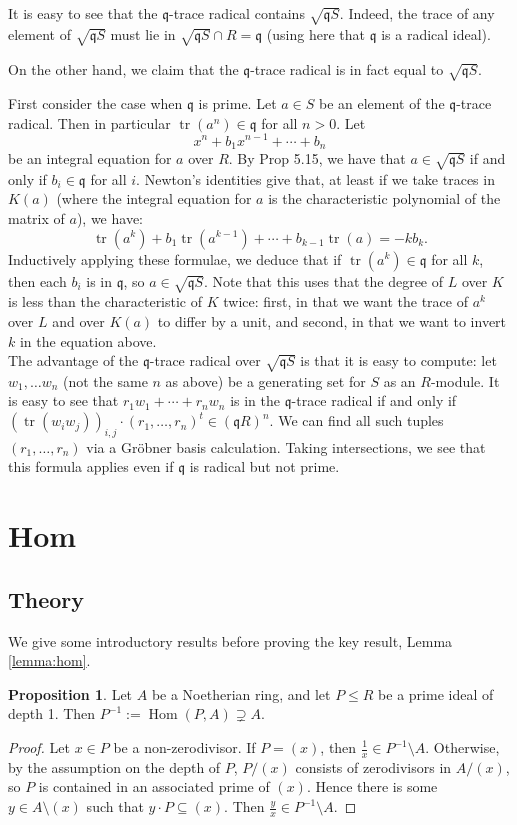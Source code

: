 \documentclass{amsart}
\theoremstyle{definition}
\newtheorem{proposition}[theorem]{Proposition}
\DeclareMathOperator{\tr}{tr}
\DeclareMathOperator{\Hom}{Hom}
\newcommand{\q}{\mathfrak{q}}
\begin{document}
It is easy to see that the $\q$-trace radical contains $\sqrt{\q S}$.  Indeed, the trace of any element of $\sqrt{\q S}$ must lie in $\sqrt{\q S}\cap R = \q$ (using here that $\q$ is a radical ideal).

On the other hand, we claim that the $\q$-trace radical is in fact equal to $\sqrt{\q S}$.

First consider the case when $\q$ is prime.  Let $a\in S$ be an element of the $\q$-trace radical.  Then in particular $\tr (a^n)\in \q$ for all $n > 0$.  Let
$$x^n + b_1 x^{n-1} + \cdots + b_n$$
be an integral equation for $a$ over $R$.  By \cite{AM} Prop 5.15, we have that $a\in \sqrt{\q S}$ if and only if $b_i \in \q$ for all $i$.  Newton's identities give that, at least if we take traces in $K(a)$ (where the integral equation for $a$ is the characteristic polynomial of the matrix of $a$), we have:
$$\tr(a^k) + b_1 \tr(a^{k-1}) + \cdots + b_{k-1} \tr(a) = -kb_k.$$
Inductively applying these formulae, we deduce that if $\tr(a^k) \in \q$ for all $k$, then each $b_i$ is in $\q$, so $a\in \sqrt{\q S}$.  Note that this uses that the degree of $L$ over $K$ is less than the characteristic of $K$ twice: first, in that we want the trace of $a^k$ over $L$ and over $K(a)$ to differ by a unit, and second, in that we want to invert $k$ in the equation above.\\

The advantage of the $\q$-trace radical over $\sqrt{\q S}$ is that it is easy to compute: let $w_1, \ldots w_n$ (not the same $n$ as above) be a generating set for $S$ as an $R$-module.  It is easy to see that $r_1 w_1 + \cdots + r_n w_n$ is in the $\q$-trace radical if and only if $(\tr(w_iw_j))_{i,j} \cdot (r_1, \ldots, r_n)^t \in (\q R)^n$.  We can find all such tuples $(r_1, \ldots, r_n)$ via a Gr\"obner basis calculation.  Taking intersections, we see that this formula applies even if $\q$ is radical but not prime.

\section{Hom}\label{sec:hom}

\subsection{Theory}

We give some introductory results before proving the key result, Lemma \ref{lemma:hom}.
\begin{proposition}\label{prop:inverse}
Let $A$ be a Noetherian ring, and let $P\leq R$ be a prime ideal of depth 1.  Then $P^{-1} := \Hom(P,A) \supsetneq A$. 
\end{proposition}
\begin{proof}
Let $x\in P$ be a non-zerodivisor.  If $P = (x)$, then $\frac{1}{x} \in P^{-1}\setminus A$.  Otherwise, by the assumption on the depth of $P$, $P/(x)$ consists of zerodivisors in $A/(x)$, so $P$ is contained in an associated prime of $(x)$.  Hence there is some $y \in A\setminus (x)$ such that $y\cdot P \subseteq (x)$.  Then $\frac{y}{x} \in P^{-1}\setminus A$.
\end{proof}
\end{document}
